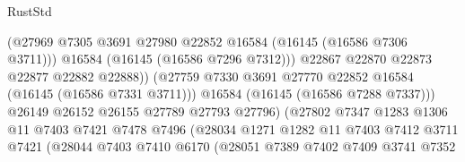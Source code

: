 \begin{lexlean}{RustStd}
\begin{coremodule}
                                          (@27969
                                            @7305
                                            @3691
                                            @27980
                                            @22852
                                            @16584
                                            (@16145 (@16586 @7306 @3711)))
                                          @16584
                                          (@16145 (@16586 @7296 @7312)))
                                        @22867
                                        @22870
                                        @22873
                                        @22877
                                        @22882
                                        @22888))
                                    (@27759
                                      @7330
                                      @3691
                                      @27770
                                      @22852
                                      @16584
                                      (@16145 (@16586 @7331 @3711)))
                                    @16584
                                    (@16145 (@16586 @7288 @7337)))
                                  @26149
                                  @26152
                                  @26155
                                  @27789
                                  @27793
                                  @27796)
                                (@27802
                                  @7347
                                  @1283
                                  @1306
                                  @11
                                  @7403
                                  @7421
                                  @7478
                                  @7496
                                  (@28034
                                    @1271
                                    @1282
                                    @11
                                    @7403
                                    @7412
                                    @3711
                                    @7421
                                    (@28044
                                      @7403
                                      @7410
                                      @6170
                                      (@28051
                                        @7389
                                        @7402
                                        @7409
                                        @3741
                                        @7352

\end{coremodule}
\end{lexlean}
